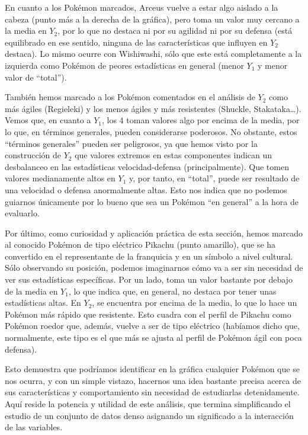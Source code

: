 \documentclass[
  12pt,
]{extreport}
\begin{document}
En cuanto a los Pokémon marcados, Arceus vuelve a estar algo aislado a
la cabeza (punto más a la derecha de la gráfica), pero toma un valor muy
cercano a la media en \(Y_2\), por lo que no destaca ni por su agilidad
ni por su defensa (está equilibrado en ese sentido, ninguna de las
características que influyen en \(Y_2\) destaca). Lo mismo ocurre con
Wishiwashi, sólo que este está completamente a la izquierda como Pokémon
de peores estadísticas en general (menor \(Y_1\) y menor valor de
``total'').

También hemos marcado a los Pokémon comentados en el análisis de \(Y_2\)
como más ágiles (Regieleki) y los menos ágiles y más resistentes
(Shuckle, Stakataka\ldots). Vemos que, en cuanto a \(Y_1\), los 4 toman
valores algo por encima de la media, por lo que, en términos generales,
pueden considerarse poderosos. No obstante, estos ``términos generales''
pueden ser peligrosos, ya que hemos visto por la construcción de \(Y_2\)
que valores extremos en estas componentes indican un desbalanceo en las
estadísticas velocidad-defensa (principalmente). Que tomen valores
medianamente altos en \(Y_1\) y, por tanto, en ``total'', puede ser
resultado de una velocidad o defensa anormalmente altas. Esto nos indica
que no podemos guiarnos únicamente por lo bueno que sea un Pokémon ``en
general'' a la hora de evaluarlo.

Por último, como curiosidad y aplicación práctica de esta sección, hemos
marcado al conocido Pokémon de tipo eléctrico Pikachu (punto amarillo),
que se ha convertido en el representante de la franquicia y en un
símbolo a nivel cultural. Sólo observando su posición, podemos
imaginarnos cómo va a ser sin necesidad de ver sus estadísticas
específicas. Por un lado, toma un valor bastante por debajo de la media
en \(Y_1\), lo que indica que, en general, no destaca por tener unas
estadísticas altas. En \(Y_2\), se encuentra por encima de la media, lo
que lo hace un Pokémon más rápido que resistente. Esto cuadra con el
perfil de Pikachu como Pokémon roedor que, además, vuelve a ser de tipo
eléctrico (habíamos dicho que, normalmente, este tipo es el que más se
ajusta al perfil de Pokémon ágil con poca defensa).

Esto demuestra que podríamos identificar en la gráfica cualquier Pokémon
que se nos ocurra, y con un simple vistazo, hacernos una idea bastante
precisa acerca de sus características y comportamiento sin necesidad de
estudiarlas detenidamente. Aquí reside la potencia y utilidad de este
análisis, que termina simplificando el estudio de un conjunto de datos
denso asignando un significado a la interacción de las variables.
\end{document}
